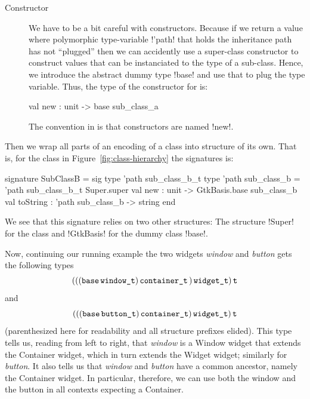 \documentclass[workingdraft,endnotes]{usetex-v1}
\begin{document}
\begin{description}
\item[Constructor] We have to be a bit careful with constructors.
  Because if we return a value where polymorphic type-variable !'path!
  that holds the inheritance path has not ``plugged'' then we can
  accidently use a super-class constructor to construct values that
  can be instanciated to the type of a sub-class.  Hence, we introduce
  the abstract dummy type !base! and use that to plug the type
  variable.  Thus, the type of the constructor for
   is:
\begin{SMLcode}
  val new : unit -> base sub_class_a
\end{SMLcode}
The convention in \gtk is that constructors are named !new!.
\end{description}
Then we wrap all parts of an encoding of a class into structure of
its own.  That is, for the class  in
Figure~\ref{fig:class-hierarchy} the \sml signatures is:
\begin{SMLcode}
  signature SubClassB =
  sig
    type 'path sub_class_b_t
    type 'path sub_class_b = 
           'path sub_class_b_t Super.super
    val new : unit 
              -> GtkBasis.base sub_class_b 
    val toString : 'path sub_class_b 
                                 -> string
  end
\end{SMLcode}
We see that this signature relies on two other structures:  The
structure !Super! for the class  and !GtkBasis! for
the dummy class !base!.

 
Now, continuing our running example the two widgets
\textit{window} and \textit{button} gets the following
types
\begin{displaymath}
(((\texttt{base}\,{\texttt{window\_t}})\,{\texttt{container\_t}}\,{)}\,{\texttt{widget\_t}})\,{\texttt{t}}
\end{displaymath}
and
\begin{displaymath}
(((\texttt{base}\,{\texttt{button\_t}})\,{\texttt{container\_t}})\,{\texttt{widget\_t}})\,{\texttt{t}}
\end{displaymath}
(parenthesized here for readability and all structure prefixes
elided).  This type tells us, reading from left to right, that
\textit{window} is a Window widget that extends the Container widget,
which in turn extends the Widget widget; similarly for
\textit{button}. It also tells us that \textit{window} and
\textit{button} have a common ancestor, namely the Container widget.
In particular, therefore, we can use both the window and the button in
all contexts expecting a Container.
\end{document}
